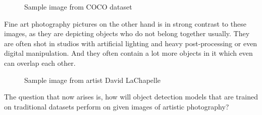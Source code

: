\begin{figure}[H]
	\caption{\label{fig:coco-sample} Sample image from COCO dataset}
\end{figure}

Fine art photography pictures on the other hand is in strong contrast to these images, as they are depicting objects who do not belong together usually. They are often shot in studios with artificial lighting and heavy post-processing or even digital manipulation. And they often contain a lot more objects in it which even can overlap each other.

\begin{figure}[H]
	\caption{\label{fig:dl_rapeofafrica} Sample image from artist David LaChapelle}
\end{figure}

The question that now arises is, how will object detection models that are trained on traditional datasets perform on given images of artistic photography?